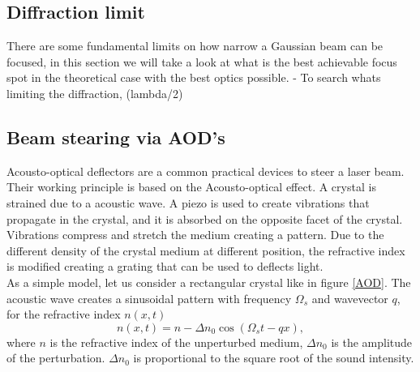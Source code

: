 \subsection{Diffraction limit}
There are some fundamental limits on how narrow a Gaussian beam can be focused, in this section we will take a look at what is the best achievable focus spot in the theoretical case with the best optics possible.
- To search whats limiting the diffraction, (lambda/2)
\subsection{Beam stearing via AOD's}
Acousto-optical deflectors are a common practical devices to steer a laser beam. Their working principle is based on the Acousto-optical effect. A crystal is strained due to a acoustic wave. A piezo is used to create vibrations that propagate in the crystal, and it is absorbed on the opposite facet of the crystal. Vibrations compress and stretch the medium creating a pattern. Due to the different density of the crystal medium at different position, the refractive index is modified creating a grating that can be used to deflects light.\\
As a simple model, let us consider a rectangular crystal like in figure \ref{AOD}. The acoustic wave creates a sinusoidal pattern with frequency $\Omega_s$ and wavevector $q$, for the refractive index $n(x,t)$
\begin{equation}
n(x,t) = n - \Delta n_0 \cos \left(\Omega_s t - qx \right),
\end{equation}
where $n$ is the refractive index of the unperturbed medium, $\Delta n_0$ is the amplitude of the perturbation. $\Delta n_0$ is proportional to the square root of the sound intensity.

